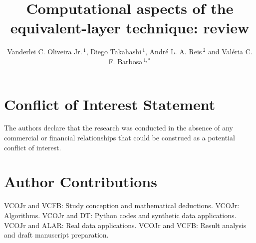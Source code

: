 \documentclass[utf8]{FrontiersinHarvard} %
\def\firstAuthorLast{Oliveira Jr. {et~al.}} %
\def\Authors{Vanderlei C. Oliveira Jr.\,$^{1}$, Diego Takahashi\,$^{1}$, Andr{\'e} L. A. Reis\,$^{2}$ and Val{\'e}ria C. F. Barbosa\,$^{1,*}$}
\begin{document}
\onecolumn
{}

\title {Computational aspects of the equivalent-layer technique: review} 

\author[\firstAuthorLast ]{\Authors} %
\address{} %
\correspondance{} %

\extraAuth{}%


\maketitle









\section*{Conflict of Interest Statement}

The authors declare that the research was conducted in the absence of any commercial or financial relationships that could be construed as a potential conflict of interest.

\section*{Author Contributions}

VCOJr and VCFB: Study conception and mathematical deductions.
VCOJr: Algorithms.
VCOJr and DT: Python codes and synthetic data applications.
VCOJr and ALAR: Real data applications.
VCOJr and VCFB:  Result analysis and draft manuscript preparation.


\end{document}
